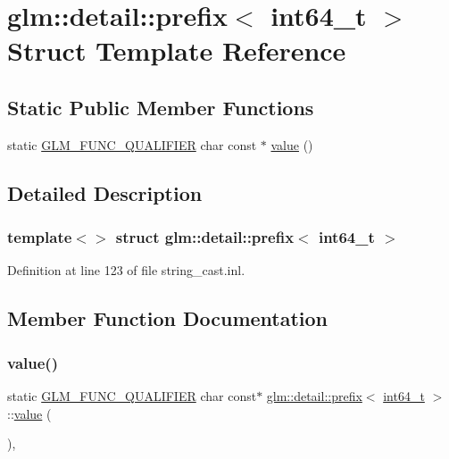 \hypertarget{structglm_1_1detail_1_1prefix_3_01int64__t_01_4}{}\section{glm\+::detail\+::prefix$<$ int64\+\_\+t $>$ Struct Template Reference}
\label{structglm_1_1detail_1_1prefix_3_01int64__t_01_4}
\subsection*{Static Public Member Functions}
\begin{DoxyCompactItemize}
\item 
static \mbox{\hyperlink{setup_8hpp_a33fdea6f91c5f834105f7415e2a64407}{G\+L\+M\+\_\+\+F\+U\+N\+C\+\_\+\+Q\+U\+A\+L\+I\+F\+I\+ER}} char const  $\ast$ \mbox{\hyperlink{structglm_1_1detail_1_1prefix_3_01int64__t_01_4_a845043fc18700790972ca73ebc80ac4d}{value}} ()
\end{DoxyCompactItemize}


\subsection{Detailed Description}
\subsubsection*{template$<$$>$\newline
struct glm\+::detail\+::prefix$<$ int64\+\_\+t $>$}



Definition at line 123 of file string\+\_\+cast.\+inl.



\subsection{Member Function Documentation}
\mbox{\label{structglm_1_1detail_1_1prefix_3_01int64__t_01_4_a845043fc18700790972ca73ebc80ac4d}} 
\subsubsection{\texorpdfstring{value()}{value()}}
{\footnotesize\ttfamily static \mbox{\hyperlink{setup_8hpp_a33fdea6f91c5f834105f7415e2a64407}{G\+L\+M\+\_\+\+F\+U\+N\+C\+\_\+\+Q\+U\+A\+L\+I\+F\+I\+ER}} char const$\ast$ \mbox{\hyperlink{structglm_1_1detail_1_1prefix}{glm\+::detail\+::prefix}}$<$ \mbox{\hyperlink{group__gtc__type__precision_ga6abb23fbf4e39c50ec5341160b5da5ab}{int64\+\_\+t}} $>$\+::\mbox{\hyperlink{glad_8h_a03aff08f73d7fde3d1a08e0abd8e84fa}{value}} (\begin{DoxyParamCaption}{ }\end{DoxyParamCaption})\hspace{0.3cm}{\ttfamily [inline]}, {\ttfamily [static]}}



